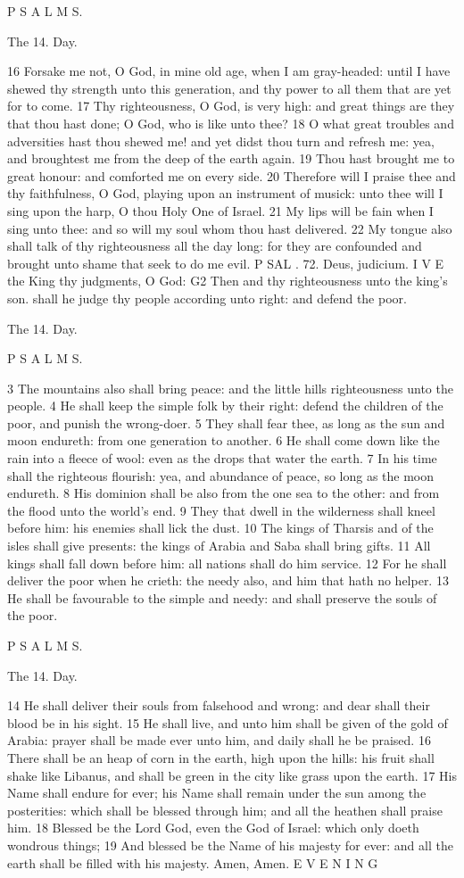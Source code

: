 P S A L M S.

The 14. Day.

16 Forsake me not, O God, in mine old age, when I am gray-headed: until I have shewed thy strength unto this generation, and thy power to all them that are yet for to come. 17 Thy righteousness, O God, is very high: and great things are they that thou hast done; O God, who is like unto thee? 18 O what great troubles and adversities hast thou shewed me! and yet didst thou turn and refresh me: yea, and broughtest me from the deep of the earth again. 19 Thou hast brought me to great honour: and comforted me on every side. 20 Therefore will I praise thee and thy faithfulness, O God, playing upon an instrument of musick: unto thee will I sing upon the harp, O thou Holy One of Israel. 21 My lips will be fain when I sing unto thee: and so will my soul whom thou hast delivered. 22 My tongue also shall talk of thy righteousness all the day long: for they are confounded and brought unto shame that seek to do me evil. P SAL . 72. Deus, judicium. I V E the King thy judgments, O God: G2 Then and thy righteousness unto the king's son. shall he judge thy people according unto right: and defend the poor.

The 14. Day.

P S A L M S.

3 The mountains also shall bring peace: and the little hills righteousness unto the people. 4 He shall keep the simple folk by their right: defend the children of the poor, and punish the wrong-doer. 5 They shall fear thee, as long as the sun and moon endureth: from one generation to another. 6 He shall come down like the rain into a fleece of wool: even as the drops that water the earth. 7 In his time shall the righteous flourish: yea, and abundance of peace, so long as the moon endureth. 8 His dominion shall be also from the one sea to the other: and from the flood unto the world’s end. 9 They that dwell in the wilderness shall kneel before him: his enemies shall lick the dust. 10 The kings of Tharsis and of the isles shall give presents: the kings of Arabia and Saba shall bring gifts. 11 All kings shall fall down before him: all nations shall do him service. 12 For he shall deliver the poor when he crieth: the needy also, and him that hath no helper. 13 He shall be favourable to the simple and needy: and shall preserve the souls of the poor.

P S A L M S.

The 14. Day.

14 He shall deliver their souls from falsehood and wrong: and dear shall their blood be in his sight. 15 He shall live, and unto him shall be given of the gold of Arabia: prayer shall be made ever unto him, and daily shall he be praised. 16 There shall be an heap of corn in the earth, high upon the hills: his fruit shall shake like Libanus, and shall be green in the city like grass upon the earth. 17 His Name shall endure for ever; his Name shall remain under the sun among the posterities: which shall be blessed through him; and all the heathen shall praise him. 18 Blessed be the Lord God, even the God of Israel: which only doeth wondrous things; 19 And blessed be the Name of his majesty for ever: and all the earth shall be filled with his majesty. Amen, Amen. E V E N I N G


